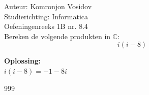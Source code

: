 \documentclass[a4paper]{article}
\begin{document}
	
	\noindent \large Auteur: Komronjon Vosidov \\
	\noindent \large Studierichting: Informatica\\
	\noindent \large Oefeningenreeks 1B nr. 8.4\\
	
	
	
	\normalsize
	Bereken de volgende produkten in $\mathbb{C}$:
	\begin{equation*}
		i(i-8)
	\end{equation*}
	
	
	\textbf{Oplossing:}\\
	
	$i(i-8)=-1-8i$ \\	
	
	
	\begin{thebibliography}{999}
		
	\end{thebibliography}	
	
	
\end{document}
